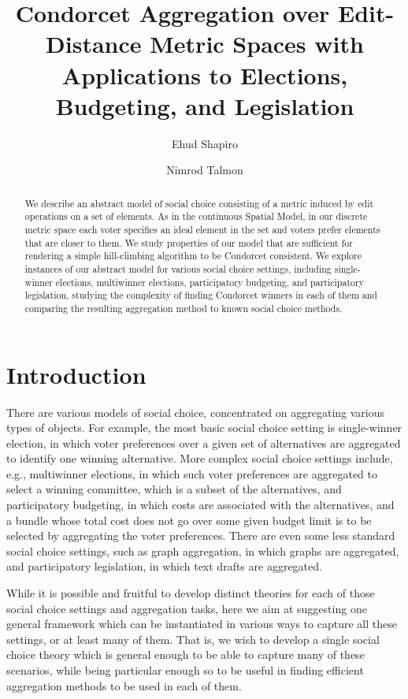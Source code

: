 \documentclass{llncs}
\title{Condorcet Aggregation over Edit-Distance Metric Spaces with Applications to Elections, Budgeting, and Legislation}
\author{
  Ehud Shapiro\inst{1}
  \and
  Nimrod Talmon\inst{2}
}
\institute{
  Weizmann Institute of Science \\ \url{ehud.shapiro@weizmann.ac.il}
  \and
  Ben-Gurion University \\ \url{talmonn@bgu.ac.il}
}
\begin{document}
\pagestyle{plain}


\maketitle


\begin{abstract}
%
We describe an abstract model of social choice consisting of a metric induced by edit operations on a set of elements.  As in the continuous Spatial Model, in our discrete metric space each voter specifies an ideal element in the set and voters prefer elements that are closer to them.
We study properties of our model that are sufficient for rendering a simple hill-climbing algorithm to be Condorcet consistent.
We explore instances of our abstract model for various social choice settings, including single-winner elections, multiwinner elections, participatory budgeting, and participatory legislation, studying the complexity of finding Condorcet winners in each of them and comparing the resulting aggregation method to known social choice methods.
%
\end{abstract}


\section{Introduction}

There are various models of social choice,
concentrated on aggregating various types of objects.
For example, the most basic social choice setting is single-winner election, in which voter preferences over a given set of alternatives are aggregated to identify one winning alternative. More complex social choice settings include, e.g., multiwinner elections, in which such voter preferences are aggregated to select a winning committee, which is a subset of the alternatives, and participatory budgeting, in which costs are associated with the alternatives, and a bundle whose total cost does not go over some given budget limit is to be selected by aggregating the voter preferences.
There are even some less standard social choice settings, such as graph aggregation, in which graphs are aggregated, and participatory legislation, in which text drafts are aggregated.

While it is possible and fruitful to develop distinct theories for each of those social choice settings and aggregation tasks, here we aim at suggesting one general framework which can be instantiated in various ways to capture all these settings, or at least many of them.
That is, we wish to develop a single social choice theory which is general enough to be able to capture many of these scenarios, while being particular enough so to be useful in finding efficient aggregation methods to be used in each of them.
\end{document}
